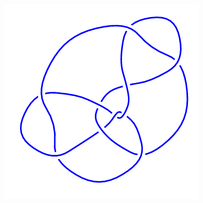 \begin{figure}[H]
\begin{minipage}[b]{.18\linewidth}
    \end{minipage}
    \begin{minipage}[b]{.18\linewidth}
        \centering
        \includegraphics[width=\linewidth]{../data/10_146.png}
    \end{minipage}
\end{figure}
